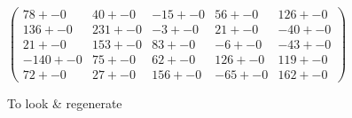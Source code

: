 \documentclass[]{report} %
\begin{document}
    \begin{figure}[H] 
            \centering
            \small
    $
          \begin{pmatrix}
                78 +- 0 & 40 +- 0 & -15 +- 0 & 56 +- 0 & 126 +- 0 \\
                136 +- 0 & 231 +- 0 & -3 +- 0 & 21 +- 0 & -40 +- 0 \\
                21 +- 0 & 153 +- 0 & 83 +- 0 & -6 +- 0 & -43 +- 0 \\
                -140 +- 0 & 75 +- 0 & 62 +- 0 & 126 +- 0 & 119 +- 0 \\
                72 +- 0 & 27 +- 0 & 156 +- 0 & -65 +- 0 & 162 +- 0 
           \end{pmatrix}
    $
            \caption{To look \& regenerate}
            \label{mat:ps20xg200xprt20xmr1-10-4}
    \end{figure}





\end{document}
